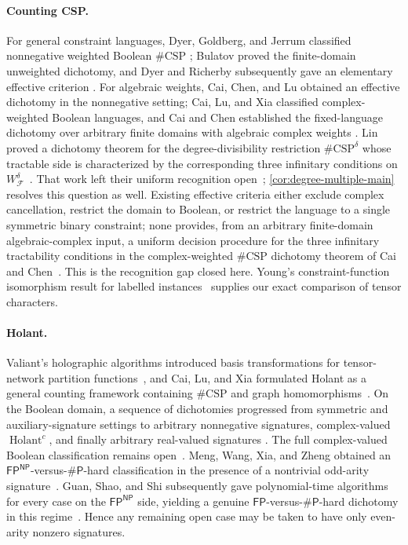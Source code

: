 \documentclass[11pt]{article}
\theoremstyle{plain}
\theoremstyle{definition}
\theoremstyle{remark}
\newcommand{\cF}{\mathcal F}
\newcommand{\WFdeg}[1]{W_{\cF}^{#1}}
\begin{document}
\paragraph{Counting CSP.}
For general constraint languages, Dyer, Goldberg, and Jerrum classified
nonnegative weighted Boolean $\#\mathrm{CSP}$
\cite{DyerGoldbergJerrum2009}; Bulatov proved the finite-domain unweighted
dichotomy, and Dyer and Richerby subsequently gave an elementary effective
criterion
\cite{Bulatov2013,DyerRicherby2013}.  For algebraic weights, Cai, Chen, and
Lu obtained an effective dichotomy in the nonnegative setting; Cai, Lu, and
Xia classified complex-weighted Boolean languages, and Cai and Chen
established the fixed-language dichotomy over arbitrary finite domains with
algebraic complex weights
\cite{CaiChenLu2016,CaiLuXia2014,CaiChen2017}.  Lin proved a dichotomy
theorem for the degree-divisibility restriction $\#\mathrm{CSP}^{\delta}$
whose tractable side is characterized by the corresponding three infinitary
conditions on $\WFdeg{\delta}$~\cite[Theorem~3]{Lin2021}.  That work left
their uniform recognition open~\cite[p.~40:3]{Lin2021};
\cref{cor:degree-multiple-main} resolves this question as well.  Existing
effective criteria either exclude complex cancellation,
restrict the domain to Boolean, or restrict the language to a single symmetric
binary constraint; none provides, from an arbitrary finite-domain
algebraic-complex input, a uniform decision procedure for the three
infinitary tractability conditions in the complex-weighted $\#\mathrm{CSP}$
dichotomy theorem of Cai and Chen~\cite[Section~3.1]{CaiChen2017}.  This is
the recognition gap closed here.  Young's constraint-function isomorphism
result for labelled instances~\cite[Corollary~35]{Young2025} supplies our
exact comparison of tensor characters.

\paragraph{Holant.}
Valiant's holographic algorithms introduced basis transformations for
tensor-network partition functions~\cite{Valiant2008}, and Cai, Lu, and Xia
formulated Holant as a general counting framework containing $\#\mathrm{CSP}$
and graph homomorphisms~\cite{CaiLuXia2009}.  On the Boolean domain, a
sequence of dichotomies progressed from symmetric and auxiliary-signature
settings to arbitrary nonnegative signatures, complex-valued
$\operatorname{Holant}^{c}$, and finally
arbitrary real-valued signatures
\cite{CaiGuoWilliams2016,LinWang2018,
Backens2021,Backens2025,ShaoCai2020}.  The full complex-valued Boolean
classification remains open~\cite{MengWangXiaZheng2025,GuanShaoShi2026}.
Meng, Wang, Xia, and Zheng obtained an
$\mathsf{FP}^{\mathsf{NP}}$-versus-$\#\mathsf P$-hard classification in the
presence of a nontrivial odd-arity signature~\cite{MengWangXiaZheng2025}.
Guan, Shao, and Shi subsequently gave polynomial-time algorithms for every
case on the $\mathsf{FP}^{\mathsf{NP}}$ side, yielding a genuine
$\mathsf{FP}$-versus-$\#\mathsf P$-hard dichotomy in this
regime~\cite{GuanShaoShi2026}.  Hence any remaining open case may be taken to
have only even-arity nonzero signatures.
\end{document}
